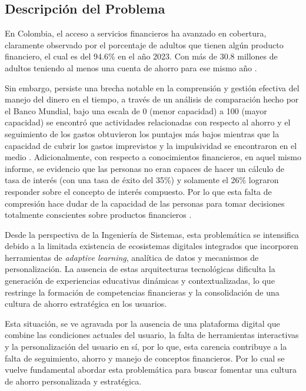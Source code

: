\subsection*{Descripción del Problema}
En Colombia, el acceso a servicios financieros ha avanzado en cobertura, claramente observado por el porcentaje de adultos que tienen algún producto financiero, el cual es del 94.6\% en el año 2023. Con más de 30.8 millones de adultos teniendo al menos una cuenta de ahorro para ese mismo año \parencite{BancadeOportunidades01}.

Sin embargo, persiste una brecha notable en la comprensión y gestión efectiva del manejo del dinero en el tiempo, a través de un análisis de comparación hecho por el Banco Mundial, bajo una escala de 0 (menor capacidad) a 100 (mayor capacidad) se encontró que actividades relacionadas con respecto al ahorro y el seguimiento de los gastos obtuvieron los puntajes más bajos mientras que la capacidad de cubrir los gastos imprevistos y la impulsividad se encontraron en el medio \parencite[p.~34-35]{BancoMundial01}. Adicionalmente, con respecto a conocimientos financieros, en aquel mismo informe, se evidencio que las personas no eran capaces de hacer un cálculo de tasa de interés (con una tasa de éxito del 35\%) y solamente el 26\% lograron responder sobre el concepto de interés compuesto. Por lo que esta falta de compresión hace dudar de la capacidad de las personas para tomar decisiones totalmente conscientes sobre productos financieros \parencite[p.~29]{BancoMundial01}.

Desde la perspectiva de la Ingeniería de Sistemas, esta problemática se intensifica debido a la limitada existencia de ecosistemas digitales integrados que incorporen herramientas de \textit{adaptive learning}, analítica de datos y mecanismos de personalización. La ausencia de estas arquitecturas tecnológicas dificulta la generación de experiencias educativas dinámicas y contextualizadas, lo que restringe la formación de competencias financieras y la consolidación de una cultura de ahorro estratégica en los usuarios.

Esta situación, se ve agravada por la ausencia de una plataforma digital que combine las condiciones actuales del usuario, la falta de herramientas interactivas y la personalización del usuario en sí, por lo que, esta carencia contribuye a la falta de seguimiento, ahorro y manejo de conceptos financieros. Por lo cual se vuelve fundamental abordar esta problemática para buscar fomentar una cultura de ahorro personalizada y estratégica.